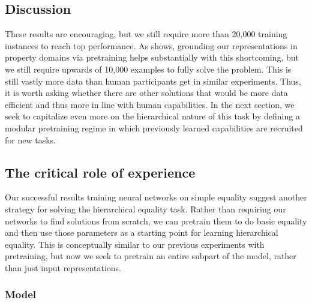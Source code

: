 \documentclass[9pt,twocolumn,twoside,lineno]{pnas-new}
\newcommand{\update}[1]{{\color{darkblue}#1}}
\begin{document}
\subsection{Discussion}

These results are encouraging, but we still require more than 20,000 training instances to reach top performance. \update{As  shows, grounding our representations in property domains via pretraining helps substantially with this shortcoming, but we still require upwards of 10,000 examples to fully solve the problem. This is still vastly more data than human participants get in similar experiments.}  Thus, it is worth asking whether there are other solutions that would be more data efficient and thus more in line with human capabilities.  In the next section, we seek to capitalize even more on the hierarchical nature of this task by defining a modular pretraining regime in which previously learned capabilities are recruited for new tasks.


\subsection{The critical role of experience}\label{sec:modular}

Our successful results training neural networks on simple equality suggest another strategy for solving the hierarchical equality task. Rather than requiring our networks to find solutions from scratch, we can pretrain them to do basic equality and then use those parameters as a starting point for learning hierarchical equality. \update{This is conceptually similar to our previous experiments with pretraining, but now we seek to pretrain an entire subpart of the model, rather than just input representations.}


\subsubsection{Model}
\end{document}
